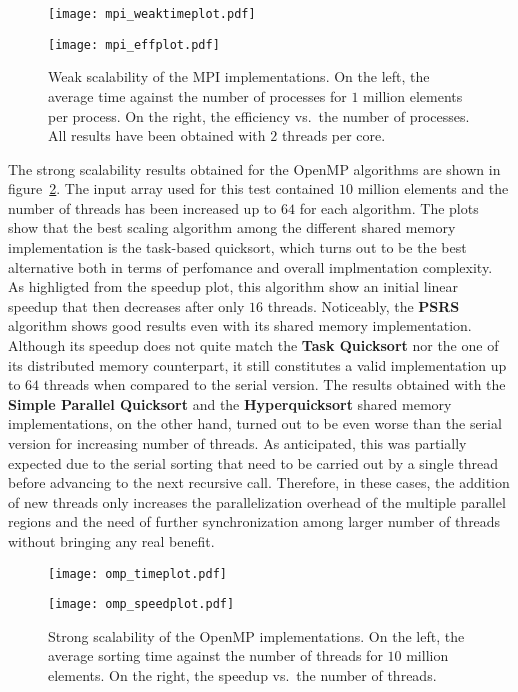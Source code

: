 \documentclass[../main.tex]{subfiles}
\begin{document}
\begin{figure}[t]
    \centering
    \begin{minipage}{0.50\textwidth}
        \centering
        \texttt{[image: mpi\_weaktimeplot.pdf]}
    \end{minipage}\hfill
    \begin{minipage}{0.50\textwidth}
        \centering
        \texttt{[image: mpi\_effplot.pdf]}
    \end{minipage}

    \caption{Weak scalability of the MPI implementations. On the left, the average time against the number of processes for $1$ million elements per process. On the right, the efficiency vs.\ the number of processes. All results have been obtained with $2$ threads per core.}
    \label{fig:weak_mpi}
\end{figure}
The strong scalability results obtained for the OpenMP algorithms are shown in figure~\ref{fig:strong_omp}. The input array used for this test contained $10$ million elements and the number of threads has been increased up to $64$ for each algorithm. The plots show that the best scaling algorithm among the different shared memory implementation is the task-based quicksort, which turns out to be the best alternative both in terms of perfomance and overall implmentation complexity. As highligted from the speedup plot, this algorithm show an initial linear speedup that then decreases after only $16$ threads. Noticeably, the \textbf{PSRS} algorithm shows good results even with its shared memory implementation. Although its speedup does not quite match the \textbf{Task Quicksort} nor the one of its distributed memory counterpart, it still constitutes a valid implementation up to $64$ threads when compared to the serial version. The results obtained with the \textbf{Simple Parallel Quicksort} and the \textbf{Hyperquicksort} shared memory implementations, on the other hand, turned out to be even worse than the serial version for increasing number of threads. As anticipated, this was partially expected due to the serial sorting that need to be carried out by a single thread before advancing to the next recursive call. Therefore, in these cases, the addition of new threads only increases the parallelization overhead of the multiple parallel regions and the need of further synchronization among larger number of threads without bringing any real benefit.\\
\begin{figure}[b]
    \centering
    \begin{minipage}{0.50\textwidth}
        \centering
        \texttt{[image: omp\_timeplot.pdf]}
    \end{minipage}\hfill
    \begin{minipage}{0.50\textwidth}
        \centering
        \texttt{[image: omp\_speedplot.pdf]}
    \end{minipage}

    \caption{Strong scalability of the OpenMP implementations. On the left, the average sorting time against the number of threads for $10$ million elements. On the right, the speedup vs.\ the number of threads.}
    \label{fig:strong_omp}
\end{figure}
\end{document}
